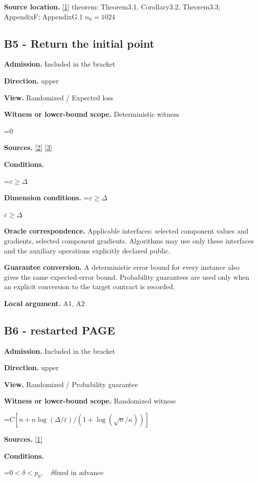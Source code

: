 \documentclass[10pt,a4paper]{article}
\newcommand{\AtlasMath}[1]{\par\begingroup\centering\setbox0=\hbox{$\displaystyle #1$}\ifdim\wd0>1.4\linewidth\typeout{ATLAS WIDE FORMULA: \the\wd0}\fi\ifdim\wd0>\linewidth\resizebox{\linewidth}{!}{\box0}\else\box0\fi\par\endgroup}
\newcommand{\AtlasInlineMath}[1]{\begingroup\setbox0=\hbox{$#1$}\ifdim\wd0>.4\linewidth\endgroup\AtlasMath{#1}\else\endgroup$#1$\fi}
\begin{document}
\textbf{Source location.} \href{https://arxiv.org/pdf/2609.00045v3}{[1]} theorem: Theorem3.1, Corollary3.2, Theorem3.3; AppendixF; AppendixG.1 $n_0=1024$

\subsection{B5 - Return the initial point}
\textbf{Admission.} Included in the bracket

\textbf{Direction.} upper

\textbf{View.} Randomized / Expected loss

\textbf{Witness or lower-bound scope.} Deterministic witness

\AtlasMath{0}
\textbf{Sources.} \href{https://proceedings.mlr.press/v97/zhou19b/zhou19b.pdf}{[2]} \href{https://arxiv.org/pdf/1405.4980}{[3]}

\textbf{Conditions.} 
\AtlasMath{\varepsilon\ge\Delta}


\textbf{Dimension conditions.} \AtlasInlineMath{\varepsilon\ge\Delta}

\textbf{Oracle correspondence.} Applicable interfaces: selected component values and gradients, selected component gradients. Algorithms may use only these interfaces and the auxiliary operations explicitly declared public.

\textbf{Guarantee conversion.} A deterministic error bound for every instance also gives the same expected-error bound. Probability guarantees are used only when an explicit conversion to the target contract is recorded.

\textbf{Local argument.} A1, A2

\subsection{B6 - restarted PAGE}
\textbf{Admission.} Included in the bracket

\textbf{Direction.} upper

\textbf{View.} Randomized / Probability guarantee

\textbf{Witness or lower-bound scope.} Randomized witness

\AtlasMath{C[n+n\log(\Delta/\varepsilon)/(1+\log(\sqrt n/\kappa))]}
\textbf{Sources.} \href{https://arxiv.org/pdf/2609.00045v3}{[1]}

\textbf{Conditions.} 
\AtlasMath{0<\delta<p_0,\quad\delta\text{fixed in advance}}
\end{document}
